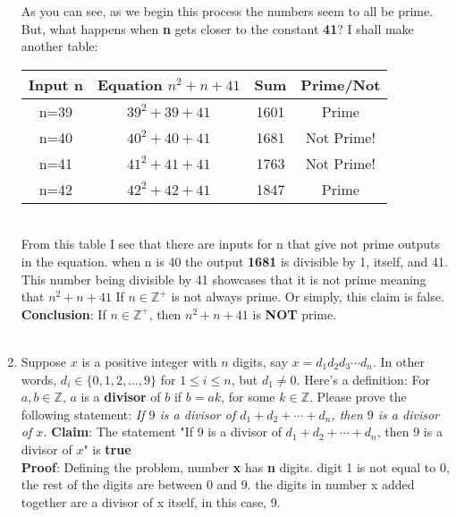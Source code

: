 \documentclass[10pt, AMS Euler]{article}
\newcommand{\Z}{\mathbb{Z}}
\begin{document}
\begin{enumerate}
As you can see, as we begin this process the numbers seem to all be prime. But, what happens when \textbf{n} gets closer to the constant \textbf{41}? I shall make another table: \\
\begin{tabular}{|c||c|c|c|}
              \hline
               Input
n& Equation
$n^{2}+n+41$& Sum&Prime/Not\\
              \hline
               n=39& $39^{2}+39+41$& 1601&Prime\\
              \hline
               n=40& $40^{2}+40+41$& 1681&Not Prime!\\
              \hline
  n=41& $41^{2}+41+41$& 1763&Not Prime!\\\hline
  n=42& $42^{2}+42+41$& 1847&Prime\\\hline
            \end{tabular}
\\From this table I see that there are inputs for n that give not prime outputs in the equation. when n is 40 the output \textbf{1681} is divisible by 1, itself, and 41. This number being divisible by 41 showcases that it is not prime meaning that $n^2 + n +41$ If $n \in \Z^+$ is not always prime. Or simply, this claim is false. \\
\textbf{Conclusion}: If $n \in \Z^+$, then $n^2 + n +41$ is \textbf{NOT} prime. \\\\
		\item Suppose $x$ is a positive integer with $n$ digits, say $x = d_1d_2d_3\cdots d_n$. In other words,
		$d_i \in \{0,1,2,\dots, 9\}$ for $1 \leq i \leq n$, but
		$d_1 \neq 0$.  Here's a definition: For $a, b \in \Z$, $a$ is a {\bf divisor} of $b$ if $b = ak$, for some $k \in \Z$.
		Please prove the following statement: \emph{If $9$ is a divisor of $d_1 + d_2 + \cdots + d_n$, then $9$ is a divisor of $x$.}
\textbf{Claim}: The statement "If $9$ is a divisor of $d_1 + d_2 + \cdots + d_n$, then $9$ is a divisor of $x$" is \textbf{true} \\
\textbf{Proof}: 
Defining the problem, number \textbf{x} has \textbf{n} digits. digit 1 is not equal to 0, the rest of the digits are between 0 and 9. the digits in number x added together are a divisor of x itself, in this case, 9. \\


\end{enumerate}
\end{document}
